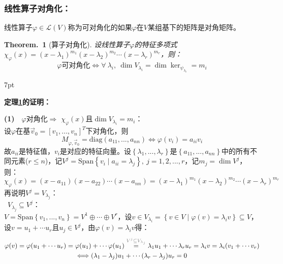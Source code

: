 \documentclass[zihao=-4,UTF8]{report}
\theoremstyle{mystyle} %
\newtheorem{theorem}{Theorem.\,}
\newenvironment{graybox}{%
\def\FrameCommand{%
\hspace{1pt}%
{\color{gray}\small \vrule width 2pt}%
{\color{graybox_color}\vrule width 4pt}%
\colorbox{graybox_color}%
}%
\MakeFramed{\advance\hsize-\width\FrameRestore}%
\noindent\hspace{-4.55pt}%
\begin{adjustwidth}{}{7pt}%
\vspace{2pt}\vspace{2pt}%
}
{%
\vspace{2pt}\end{adjustwidth}\endMakeFramed%
}
\begin{document}
\subsubsection{线性算子对角化：}
线性算子$\varphi \in \mathscr{L}(V)$称为可对角化的如果$\varphi$在$V$某组基下的矩阵是对角矩阵。
\begin{theorem}[算子对角化]\label{线性算子对角化}
设线性算子$\varphi$的特征多项式$\chi_{\varphi}(x) = (x-\lambda_1)^{m_1}(x-\lambda_2)^{m_2} \cdots (x-\lambda_r)^{m_r}$，则：
\begin{equation*}
   \text{$\varphi$可对角化} \Longleftrightarrow \forall\ \lambda_i,\ \dim V_{\lambda_i} = \dim \ker_{\psi_{\lambda_i}}= m_i 
\end{equation*}
\end{theorem}
\begin{graybox}
\textbf{定理\ref{线性算子对角化}的证明：}\par
\noindent \textbf{(1)}\ \ $\varphi$对角化$\Longrightarrow$ $\chi_{\varphi}(x)$且$\dim V_{\lambda_i} = m_i$：\\
设$\varphi$在基$\vec{v}_0 = [v_1,...,v_n]^T$下对角化，则
\begin{equation*}
    M_{\varphi,\vec{v}_0} = \text{diag}(a_{11},...,a_{nn}) \Longleftrightarrow \varphi(v_i) = a_{ii}v_i 
\end{equation*}
故$a_{ii}$是特征值，$v_i$是对应的特征向量。设$\left\{\lambda_1,...,\lambda_r\right\}$是$\left\{a_{11},...,a_{nn}\right\}$中的所有不同元素($r\le n$)，记$V^j = \text{Span} \left\{ v_i \mid a_{ii} = \lambda_j\right\},\ j = 1,2,...,r$，记$m_j = \dim V^j$，则：
\begin{equation*}
    \chi_{\varphi}(x) = (x-a_{11})(x-a_{22}) \cdots (x-a_{nn}) = (x-\lambda_1)^{m_1}(x-\lambda_2)^{m_2} \cdots (x-\lambda_r)^{m_r}
\end{equation*}
再说明$V^j = V_{\lambda_j}$：\\
\ $V_{\lambda_j} \subseteq V^j$：\\
$V = \text{Span} \left\{v_1,...,v_n\right\} = V^1 \oplus \cdots \oplus V^r$，设$v \in V_{\lambda_i} = \left\{v \in V\mid \varphi(v) = \lambda_iv\right\} \subseteq V$，设$v = u_1 + \cdots u_r$且$u_j \in V^j$，由$\varphi(v) = \lambda_i v$得：
\begin{gather*}
    \varphi(v) =\varphi(u_1 + \cdots u_r) = \varphi(u_1) + \cdots \varphi(u_1) 
    \overset{\textcolor{gray}{V^j\subseteq V_{\lambda_j}} }{=} \lambda_1u_1 + \cdots \lambda_ru_r =\lambda_iv = \lambda_i(v_1 + \cdots v_r) \\
    \Longleftrightarrow  (\lambda_1- \lambda_j)u_1 + \cdots (\lambda_r -\lambda_j)u_r = 0

\end{gather*}
\end{graybox}
\end{document}
